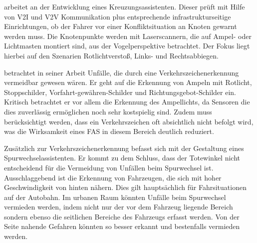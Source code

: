 \Textcite[S. 2]{Schendzielorz.21.09.2016} arbeitet an der Entwicklung eines Kreuzungsassistenten. Dieser prüft mit Hilfe von \ac{V2I} und \ac{V2V} Kommunikation plus entsprechende infrastrukturseitige Einrichtungen, ob der Fahrer vor einer Konfliktsituation an Knoten gewarnt werden muss. Die Knotenpunkte werden mit Laserscannern, die auf Ampel- oder Lichtmasten montiert sind, aus der Vogelperspektive betrachtet. Der Fokus liegt hierbei auf den Szenarien Rotlichtverstoß, Links- und Rechtsabbiegen.

\Textcite[S. 224-230]{Grundl.2005} betrachtet in seiner Arbeit Unfälle, die durch eine Verkehrszeichenerkennung vermeidbar gewesen wären. Er geht auf die Erkennung von Ampeln mit Rotlicht, Stoppschilder, Vorfahrt-gewähren-Schilder und Richtungsgebot-Schilder ein. Kritisch betrachtet er vor allem die Erkennung des Ampellichts, da Sensoren die dies zuverlässig ermöglichen noch sehr kostspielig sind. Zudem muss berücksichtigt werden, dass ein Verkehrszeichen oft absichtlich nicht befolgt wird, was die Wirksamkeit eines \ac{FAS} in diesem Bereich deutlich reduziert.

Zusätzlich zur Verkehrszeichenerkennung befasst sich \Textcite[S. 239-246]{Grundl.2005} mit der Gestaltung eines Spurwechselassistenten. Er kommt zu dem Schluss, dass der Totewinkel nicht entscheidend für die Vermeidung von Unfällen beim Spurwechsel ist. Ausschlaggebend ist die Erkennung von Fahrzeugen, die sich mit hoher Geschwindigkeit von hinten nähern. Dies gilt hauptsächlich für Fahrsituationen auf der Autobahn. Im urbanen Raum könnten Unfälle beim Spurwechsel vermieden werden, indem nicht nur der vor dem Fahrzeug liegende Bereich sondern ebenso die seitlichen Bereiche des Fahrzeugs erfasst werden. Von der Seite nahende Gefahren könnten so besser erkannt und bestenfalls vermieden werden.

